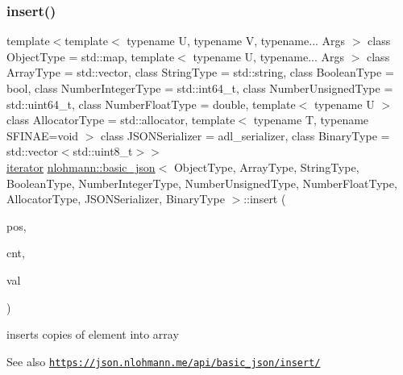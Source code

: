 \subsubsection{\texorpdfstring{insert()}{insert()}\hspace{0.1cm}{\footnotesize\ttfamily [3/6]}}
{\footnotesize\ttfamily template$<$template$<$ typename U, typename V, typename... Args $>$ class Object\+Type = std\+::map, template$<$ typename U, typename... Args $>$ class Array\+Type = std\+::vector, class String\+Type  = std\+::string, class Boolean\+Type  = bool, class Number\+Integer\+Type  = std\+::int64\+\_\+t, class Number\+Unsigned\+Type  = std\+::uint64\+\_\+t, class Number\+Float\+Type  = double, template$<$ typename U $>$ class Allocator\+Type = std\+::allocator, template$<$ typename T, typename S\+F\+I\+N\+A\+E=void $>$ class J\+S\+O\+N\+Serializer = adl\+\_\+serializer, class Binary\+Type  = std\+::vector$<$std\+::uint8\+\_\+t$>$$>$ \\
\hyperlink{classnlohmann_1_1basic__json_aa549b2b382916b3baafb526e5cb410bd}{iterator} \hyperlink{classnlohmann_1_1basic__json}{nlohmann\+::basic\+\_\+json}$<$ Object\+Type, Array\+Type, String\+Type, Boolean\+Type, Number\+Integer\+Type, Number\+Unsigned\+Type, Number\+Float\+Type, Allocator\+Type, J\+S\+O\+N\+Serializer, Binary\+Type $>$\+::insert (\begin{DoxyParamCaption}\item[{\hyperlink{classnlohmann_1_1basic__json_aebd2cfa7e4ded4e97cde9269bfeeea38}{const\+\_\+iterator}}]{pos,  }\item[{\hyperlink{classnlohmann_1_1basic__json_a3ada29bca70b4965f6fd37ec1c8f85f7}{size\+\_\+type}}]{cnt,  }\item[{const \hyperlink{classnlohmann_1_1basic__json}{basic\+\_\+json}$<$ Object\+Type, Array\+Type, String\+Type, Boolean\+Type, Number\+Integer\+Type, Number\+Unsigned\+Type, Number\+Float\+Type, Allocator\+Type, J\+S\+O\+N\+Serializer, Binary\+Type $>$ \&}]{val }\end{DoxyParamCaption})\hspace{0.3cm}{\ttfamily [inline]}}



inserts copies of element into array 

\begin{DoxySeeAlso}{See also}
\href{https://json.nlohmann.me/api/basic_json/insert/}{\tt https\+://json.\+nlohmann.\+me/api/basic\+\_\+json/insert/} 
\end{DoxySeeAlso}
\mbox{\label{classnlohmann_1_1basic__json_a8137d5471edcd71606e42155ed9c23e2}} 
